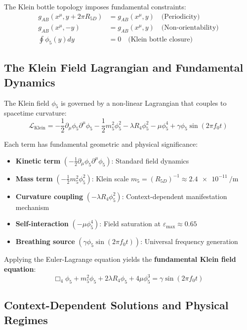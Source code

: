 \documentclass[aps,prl,twocolumn,showpacs,superscriptaddress,groupedaddress]{revtex4-1}
\newcommand{\phifive}{\phi_5}
\newcommand{\epsmax}{\varepsilon_{\text{max}}}
\newcommand{\fzero}{f_0}
\newcommand{\Rfive}{R_{5D}}
\newcommand{\Rfour}{R_4}
\newcommand{\dalembertian}{\Box_4}
\begin{document}
The Klein bottle topology imposes fundamental constraints:
\begin{align}
g_{AB}(x^\mu, y + 2\pi\Rfive) &= g_{AB}(x^\mu, y) \quad \text{(Periodicity)} \\
g_{AB}(x^\mu, -y) &= g_{AB}(x^\mu, y) \quad \text{(Non-orientability)} \\
\oint \phifive(y) dy &= 0 \quad \text{(Klein bottle closure)}
\end{align}

\subsection{The Klein Field Lagrangian and Fundamental Dynamics}

The Klein field $\phifive$ is governed by a non-linear Lagrangian that couples to spacetime curvature:
\begin{equation}
\mathcal{L}_{\text{Klein}} = -\frac{1}{2} \partial_\mu\phifive \partial^\mu\phifive - \frac{1}{2}m_5^2\phifive^2 - \lambda\Rfour\phifive^2 - \mu\phifive^4 + \gamma\phifive \sin(2\pi\fzero t)
\label{eq:klein_lagrangian}
\end{equation}

Each term has fundamental geometric and physical significance:
\begin{itemize}
\item \textbf{Kinetic term} $(-\frac{1}{2} \partial_\mu\phifive \partial^\mu\phifive)$: Standard field dynamics
\item \textbf{Mass term} $(-\frac{1}{2}m_5^2\phifive^2)$: Klein scale $m_5 = (\Rfive)^{-1} \approx \SI{2.4e-11}{\per\meter}$
\item \textbf{Curvature coupling} $(-\lambda\Rfour\phifive^2)$: Context-dependent manifestation mechanism
\item \textbf{Self-interaction} $(-\mu\phifive^4)$: Field saturation at $\epsmax \approx 0.65$
\item \textbf{Breathing source} $(\gamma\phifive \sin(2\pi\fzero t))$: Universal frequency generation
\end{itemize}

Applying the Euler-Lagrange equation yields the \textbf{fundamental Klein field equation}:
\begin{equation}
\dalembertian\phifive + m_5^2\phifive + 2\lambda\Rfour\phifive + 4\mu\phifive^3 = \gamma \sin(2\pi\fzero t)
\label{eq:klein_field_equation}
\end{equation}

\subsection{Context-Dependent Solutions and Physical Regimes}
\end{document}
